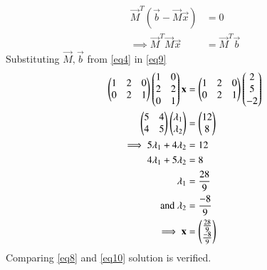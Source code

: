 \documentclass[journal,12pt,twocolumn]{IEEEtran}
\begin{document}
\begin{align}
	\vec{M}^T(\vec{b} - \vec{M}\vec{x}) &= 0\\
	\label{eq9}\implies \vec{M}^T\vec{M}\vec{x} &= \vec{M}^T\vec{b}
\end{align}
Substituting $\vec{M}, \vec{b}$ from \eqref{eq4} in \eqref{eq9}
\begin{align}
	\begin{pmatrix}1 & 2 & 0\\0 & 2 & 1\end{pmatrix}\begin{pmatrix}1 & 0\\2 & 2\\0 & 1\end{pmatrix}\mathbf{x} &= \begin{pmatrix}1 & 2 & 0\\0 & 2 & 1\end{pmatrix}\begin{pmatrix}2\\5\\-2\end{pmatrix}\\
	\begin{pmatrix}5 & 4\\4 & 5\end{pmatrix}\begin{pmatrix}\lambda_1\\\lambda_2\end{pmatrix} &= \begin{pmatrix}12\\8\end{pmatrix}\\
	\implies5\lambda_1 + 4\lambda_2&= 12\\
	4\lambda_1 + 5\lambda_2&= 8\\
	\lambda_1 &= \frac{28}{9}\\
	\text{and }\lambda_2 &= \frac{-8}{9}\\
	\label{eq10}\implies\mathbf{x} &= \begin{pmatrix}\frac{28}{9}\\\frac{-8}{9}\end{pmatrix}
\end{align}
Comparing \eqref{eq8} and \eqref{eq10} solution is verified.
\end{document}
